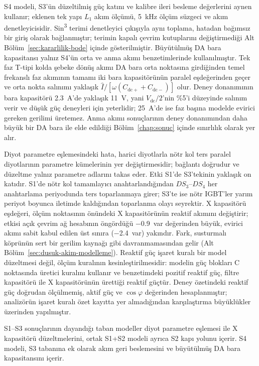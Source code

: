 S4 modeli, S3'ün düzeltilmiş güç katını ve kalibre ileri besleme değerlerini aynen kullanır; eklenen tek yapı $L_1$ akım ölçümü, \SI{5}{\kilo\hertz} ölçüm süzgeci ve akım denetleyicisidir. Sin\textsuperscript{3} terimi denetleyici çıkışıyla aynı toplama, hatadan bağımsız bir giriş olarak bağlanmıştır; terimin kapalı çevrim kutuplarını değiştirmediği Alt Bölüm~\ref{sec:kararlilik-bode} içinde gösterilmiştir. Büyütülmüş DA bara kapasitansı yalnız S4'ün orta ve anma akımı benzetimlerinde kullanılmıştır. Tek faz T-tipi kolda şebeke dönüş akımı DA bara orta noktasına girdiğinden temel frekanslı faz akımının tamamı iki bara kapasitörünün paralel eşdeğerinden geçer ve orta nokta salınımı yaklaşık $\hat I/[\omega(C_{\mathrm{dc}+}+C_{\mathrm{dc}-})]$ olur. Deney donanımının bara kapasitörü \SI{2.3}{\ampere}'de yaklaşık \SI{11}{\volt}, yani $V_{\mathrm{dc}}/2$'nin \%5'i düzeyinde salınım verir ve düşük güç deneyleri için yeterlidir; \SI{25}{\ampere}'de ise faz başına modelde evirici gereken gerilimi üretemez. Anma akımı sonuçlarının deney donanımından daha büyük bir DA bara ile elde edildiği Bölüm~\ref{chap:sonuc} içinde sınırlılık olarak yer alır.

Diyot parametre eşlemesindeki hata, harici diyotlarla nötr kol ters paralel diyotlarının parametre kümelerinin yer değiştirmesidir; bağlantı doğrudur ve düzeltme yalnız parametre adlarını takas eder. Etki S1'de S3'tekinin yaklaşık on katıdır. S1'de nötr kol tamamlayıcı anahtarlandığından $DS_3$--$DS_4$ her anahtarlama periyodunda ters toparlanmaya girer; S3'te ise nötr IGBT'ler yarım periyot boyunca iletimde kaldığından toparlanma olayı seyrektir. X kapasitörü eşdeğeri, ölçüm noktasının önündeki X kapasitörünün reaktif akımını değiştirir; etkisi açık çevrim ağ hesabının öngördüğü \num{-0.9}~var değerinden büyük, evirici akımı sabit kabul edilen üst sınıra (\num{-2.4}~var) yakındır. Fark, susturmalı köprünün sert bir gerilim kaynağı gibi davranmamasından gelir (Alt Bölüm~\ref{sec:dusuk-akim-modelleme}). Reaktif güç işaret kuralı bir model düzeltmesi değil, ölçüm kuralının kesinleştirilmesidir: modelin güç blokları C noktasında üretici kuralını kullanır ve benzetimdeki pozitif reaktif güç, filtre kapasitörü ile X kapasitörünün ürettiği reaktif güçtür. Deney özetindeki reaktif güç doğrudan ölçülmemiş, aktif güç ve $\cos\varphi$ değerinden hesaplanmıştır; analizörün işaret kuralı özet kayıtta yer almadığından karşılaştırma büyüklükler üzerinden yapılmıştır.

S1--S3 sonuçlarının dayandığı taban modeller diyot parametre eşlemesi ile X kapasitörü düzeltmelerini, ortak S1+S2 modeli ayrıca S2 kapı yolunu içerir. S4 modeli, S3 tabanına ek olarak akım geri beslemesini ve büyütülmüş DA bara kapasitansını içerir.

